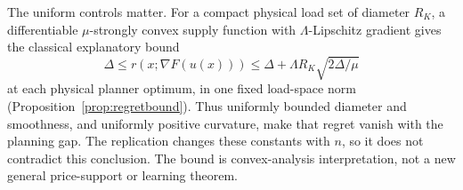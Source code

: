 The uniform controls matter. For a compact physical load set of diameter
$R_K$, a differentiable $\mu$-strongly convex supply function with
$\Lambda$-Lipschitz gradient gives the classical explanatory bound
\[
 \Delta\le r(x;\nabla F(u(x)))\le
 \Delta+\Lambda R_K\sqrt{2\Delta/\mu}
\]
at each physical planner optimum, in one fixed load-space norm
(Proposition~\ref{prop:regretbound}). Thus uniformly bounded diameter and
smoothness, and uniformly positive curvature, make that regret vanish with
the planning gap. The replication changes these constants with $n$, so it
does not contradict this conclusion. The bound is convex-analysis
interpretation, not a new general price-support or learning theorem.
